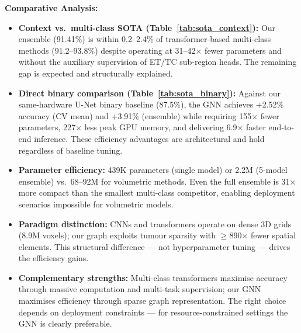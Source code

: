 \textbf{Comparative Analysis:}

\begin{itemize}
    \item \textbf{Context vs.\ multi-class SOTA (Table~\ref{tab:sota_context}):} Our ensemble (91.41\%) is within 0.2--2.4\% of transformer-based multi-class methods (91.2--93.8\%) despite operating at 31--42$\times$ fewer parameters and without the auxiliary supervision of ET/TC sub-region heads. The remaining gap is expected and structurally explained.

    \item \textbf{Direct binary comparison (Table~\ref{tab:sota_binary}):} Against our same-hardware U-Net binary baseline (87.5\%), the GNN achieves +2.52\% accuracy (CV mean) and +3.91\% (ensemble) while requiring 155$\times$ fewer parameters, 227$\times$ less peak GPU memory, and delivering 6.9$\times$ faster end-to-end inference. These efficiency advantages are architectural and hold regardless of baseline tuning.

    \item \textbf{Parameter efficiency:} 439K parameters (single model) or 2.2M (5-model ensemble) vs.\ 68--92M for volumetric methods. Even the full ensemble is 31$\times$ more compact than the smallest multi-class competitor, enabling deployment scenarios impossible for volumetric models.

    \item \textbf{Paradigm distinction:} CNNs and transformers operate on dense 3D grids (8.9M voxels); our graph exploits tumour sparsity with $\geq$890$\times$ fewer spatial elements. This structural difference — not hyperparameter tuning — drives the efficiency gains.

    \item \textbf{Complementary strengths:} Multi-class transformers maximise accuracy through massive computation and multi-task supervision; our GNN maximises efficiency through sparse graph representation. The right choice depends on deployment constraints — for resource-constrained settings the GNN is clearly preferable.
\end{itemize}

\vspace{5mm}

